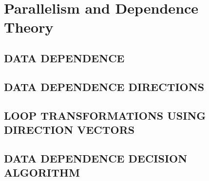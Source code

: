 \newpage


\section{Parallelism and Dependence Theory}

\subsection{DATA DEPENDENCE}




\subsection{DATA DEPENDENCE DIRECTIONS}





\subsection{LOOP TRANSFORMATIONS USING DIRECTION VECTORS}





\subsection{DATA DEPENDENCE DECISION ALGORITHM}